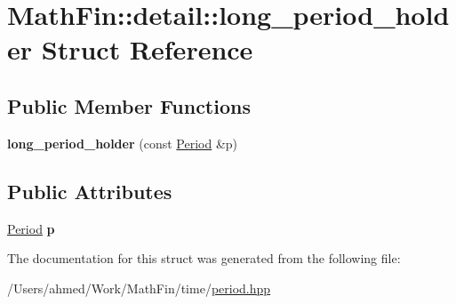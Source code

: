 \hypertarget{struct_math_fin_1_1detail_1_1long__period__holder}{}\section{Math\+Fin\+:\+:detail\+:\+:long\+\_\+period\+\_\+holder Struct Reference}
\label{struct_math_fin_1_1detail_1_1long__period__holder}
\subsection*{Public Member Functions}
\begin{DoxyCompactItemize}
\item 
\hypertarget{struct_math_fin_1_1detail_1_1long__period__holder_a5c3fb37a3286eae18820f50658a59959}{}{\bfseries long\+\_\+period\+\_\+holder} (const \hyperlink{class_math_fin_1_1_period}{Period} \&p)\label{struct_math_fin_1_1detail_1_1long__period__holder_a5c3fb37a3286eae18820f50658a59959}

\end{DoxyCompactItemize}
\subsection*{Public Attributes}
\begin{DoxyCompactItemize}
\item 
\hypertarget{struct_math_fin_1_1detail_1_1long__period__holder_a0cbd270e40f84292f313b12e4947d5d8}{}\hyperlink{class_math_fin_1_1_period}{Period} {\bfseries p}\label{struct_math_fin_1_1detail_1_1long__period__holder_a0cbd270e40f84292f313b12e4947d5d8}

\end{DoxyCompactItemize}


The documentation for this struct was generated from the following file\+:\begin{DoxyCompactItemize}
\item 
/\+Users/ahmed/\+Work/\+Math\+Fin/time/\hyperlink{period_8hpp}{period.\+hpp}\end{DoxyCompactItemize}
